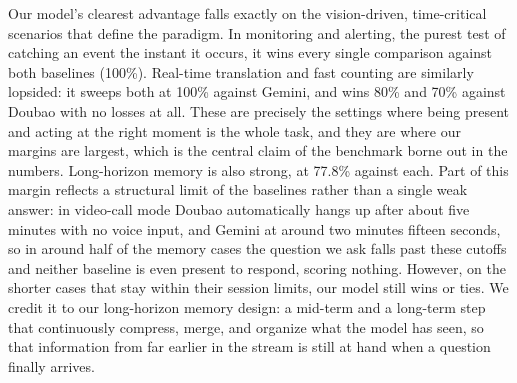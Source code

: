 Our model's clearest advantage falls exactly on the vision-driven, time-critical scenarios that define the paradigm. In monitoring and alerting, the purest test of catching an event the instant it occurs, it wins every single comparison against both baselines (100\%). Real-time translation and fast counting are similarly lopsided: it sweeps both at 100\% against Gemini, and wins 80\% and 70\% against Doubao with no losses at all. These are precisely the settings where being present and acting at the right moment is the whole task, and they are where our margins are largest, which is the central claim of the benchmark borne out in the numbers. Long-horizon memory is also strong, at 77.8\% against each. Part of this margin reflects a structural limit of the baselines rather than a single weak answer: in video-call mode Doubao automatically hangs up after about five minutes with no voice input, and Gemini at around two minutes fifteen seconds, so in around half of the memory cases the question we ask falls past these cutoffs and neither baseline is even present to respond, scoring nothing. However, on the shorter cases that stay within their session limits, our model still wins or ties. We credit it to our long-horizon memory design: a mid-term and a long-term step that continuously compress, merge, and organize what the model has seen, so that information from far earlier in the stream is still at hand when a question finally arrives.

